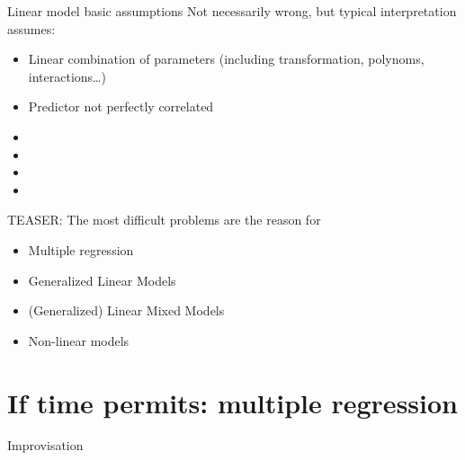 \documentclass[10pt]{beamer}\usepackage[]{graphicx}\usepackage[]{color}
\begin{document}


\begin{frame}{Linear model basic assumptions}
Not necessarily wrong, but typical interpretation assumes:
 \begin{block}{}
     \begin{itemize}
      \item Linear combination of parameters (including transformation, polynoms, interactions\dots)
      \item Predictor not perfectly correlated 
       \item {\color{red!20!black}{Measurement error in predictors}}
       \item {\color{red!50!black}{Gaussian error distribution}}
       \item {\color{red!70!black}{Homoscedasticity (constant error variance)}}
       \item {\color{red!99!black}{Independence of error}}
     \end{itemize}
 \end{block}
 
 \pause
 \begin{exampleblock}{TEASER: The most difficult problems are the reason for}
  \begin{itemize}[<+->]
    \item Multiple regression
    \item Generalized Linear Models
    \item (Generalized) Linear Mixed Models
    \item Non-linear models
  \end{itemize}
 \end{exampleblock}
\end{frame}

\section{If time permits: multiple regression}

\begin{frame}{Improvisation}

\end{frame}
% 
% 
% 
% 
\end{document}
